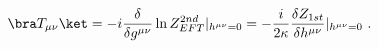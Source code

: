 \begin{equation}
\bra T_{\mu\nu}\ket = -i\frac{\delta}{\delta g^{\mu\nu}}\ln
Z^{2nd}_{EFT}|_{h^{\mu\nu}=0} = -\frac{i}{2\kappa}\frac{\delta
Z_{1st}}{\delta h^{\mu\nu}}|_{h^{\mu\nu}=0} \ . \label{T1}
\end{equation}

